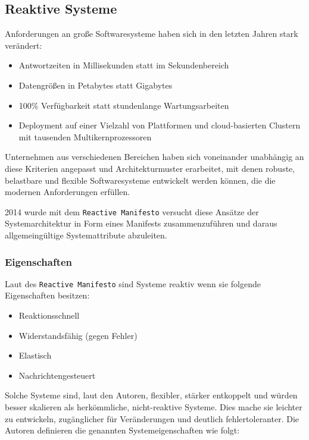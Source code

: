\subsection{Reaktive Systeme}
\label{subsection:reaktive_systeme}
Anforderungen an große Softwaresysteme haben sich in den letzten Jahren stark verändert:
\begin{itemize}
    \item Antwortzeiten in Millisekunden statt im Sekundenbereich
    \item Datengrößen in Petabytes statt Gigabytes
    \item 100\% Verfügbarkeit statt stundenlange Wartungsarbeiten
    \item Deployment auf einer Vielzahl von Plattformen und cloud-basierten Clustern mit tausenden Multikernprozessoren
\end{itemize}

Unternehmen aus verschiedenen Bereichen haben sich voneinander unabhängig an diese Kriterien angepasst und Architekturmuster
erarbeitet, mit denen robuste, belastbare und flexible Softwaresysteme entwickelt werden können, die die modernen Anforderungen
erfüllen.

2014 wurde mit dem \verb|Reactive Manifesto| versucht diese Ansätze der Systemarchitektur in Form eines Manifests zusammenzuführen
und daraus allgemeingültige Systemattribute abzuleiten.

\subsubsection{Eigenschaften}
\label{subsubsec:reaktive_systeme_eigenschaften}
Laut des \verb|Reactive Manifesto| sind Systeme reaktiv wenn sie folgende Eigenschaften besitzen:
\begin{itemize}
    \item Reaktionsschnell
    \item Widerstandsfähig (gegen Fehler)
    \item Elastisch
    \item Nachrichtengesteuert
\end{itemize}
Solche Systeme sind, laut den Autoren, flexibler, stärker entkoppelt und würden besser skalieren als herkömmliche, nicht-reaktive Systeme.
Dies mache sie leichter zu entwickeln, zugänglicher für Veränderungen und deutlich fehlertoleranter.
\newline\newline
Die Autoren definieren die genannten Systemeigenschaften wie folgt:
